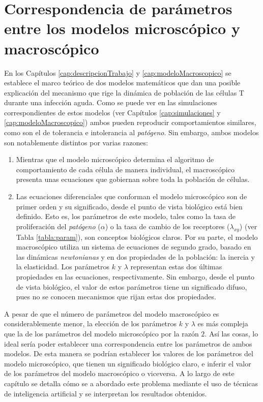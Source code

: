 \chapter{Correspondencia de parámetros entre los modelos microscópico y macroscópico}
\label{cap:redNeuronal}

En los Capítulos \ref{cap:descripcionTrabajo} y \ref{cap:modeloMacroscopico} se establece el marco teórico de dos modelos matemáticos que dan una posible explicación del mecanismo que rige la dinámica de población de las células T durante una infección aguda. Como se puede ver en las simulaciones correspondientes de estos modelos (ver Capítulos \ref{cap:simulaciones} y \ref{cap:modeloMacroscopico}) ambos pueden reproducir comportamientos similares, como son el de tolerancia e intolerancia al \textit{patógeno}. Sin embargo, ambos modelos son notablemente distintos por varias razones: 

\begin{enumerate}
	\item Mientras que el modelo microscópico determina el algoritmo de comportamiento de cada célula de manera individual, el macroscópico presenta unas ecuaciones que gobiernan sobre toda la población de células. 
	
	\item Las ecuaciones diferenciales que conforman el modelo microscópico son de primer orden y su significado, desde el punto de vista biológico está bien definido. Esto es, los parámetros de este modelo, tales como la tasa de proliferación del \textit{patógeno} ($\alpha$) o la tasa de cambio de los receptores ($\lambda_{xy}$) (ver Tabla \ref{tabla:param}), son conceptos biológicos claros. Por su parte, el modelo macroscópico utiliza un sistema de ecuaciones de segundo grado, basado en las dinámicas \textit{newtonianas} y en dos propiedades de la población: la inercia y la elasticidad. Los parámetros $k$ y $\lambda$ representan estas dos últimas propiedades en las ecuaciones, respectivamente. Sin embargo, desde el punto de vista biológico, el valor de estos parámetros tiene un significado difuso, pues no se conocen mecanismos que rijan estas dos propiedades.
	
\end{enumerate}

A pesar de que el número de parámetros del modelo macroscópico es considerablemente menor, la elección de los parámetros $k$ y $\lambda$ es más compleja que la de los parámetros del modelo microscópico por la razón $2$. Así las cosas, lo ideal sería poder establecer una correspondencia entre los parámetros de ambos modelos. De esta manera se podrían establecer los valores de los parámetros del modelo microscópico, que tienen un significado biológico claro, e inferir el valor de los parámetros del modelo macroscópico o viceversa. A lo largo de este capítulo se detalla cómo se a abordado este problema mediante el uso de técnicas de inteligencia artificial y se interpretan los resultados obtenidos. 


